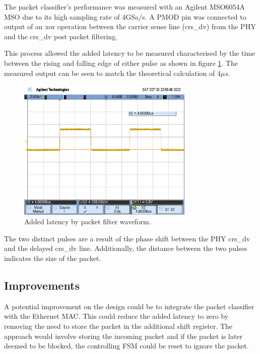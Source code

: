 The packet classifier's performance was measured with an Agilent MSO6054A MSO due to its high sampling rate of 4GSa/s. A PMOD pin was connected to output of an xor operation between the carrier sense line (crs\_dv) from the PHY and the crs\_dv post packet filtering. 

This process allowed the added latency to be measured characterised by the time between the rising and falling edge of either pulse as shown in figure \ref{fig:pf_added_latency}. The measured output can be seen to match the theoretical calculation of $4\mu s$.


\begin{figure}[h!]
    \centering
    \includegraphics[width=0.75\textwidth]{Images/scope_4.png}
    \caption[Added latency by packet filter waveform]{Added latency by packet filter waveform.}
    \label{fig:pf_added_latency}
\end{figure}


The two distinct pulses are a result of the phase shift between the PHY crs\_dv and the delayed crs\_dv line. Additionally, the distance between the two pulses indicates the size of the packet. 


\subsection{Improvements}
A potential improvement on the design could be to integrate the packet classifier with the Ethernet MAC. This could reduce the added latency to zero by removing the need to store the packet in the additional shift register. The approach would involve storing the incoming packet and if the packet is later deemed to be blocked, the controlling FSM could be reset to ignore the packet. 











